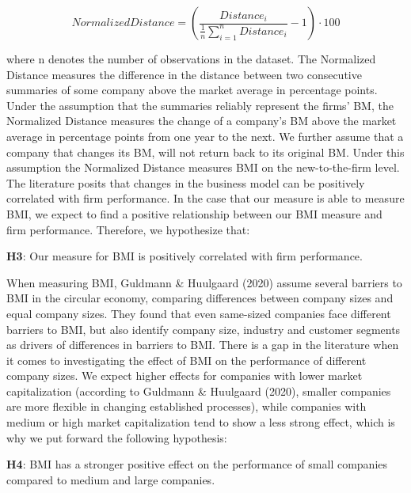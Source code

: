 \documentclass[
]{article}
\begin{document}
\[
{NormalizedDistance} = \left( \frac{{Distance}_i}{\frac{1}{n} \sum_{i=1}^{n} {Distance}_i} - 1 \right) \cdot 100
\]

where n denotes the number of observations in the dataset. The
Normalized Distance measures the difference in the distance between two
consecutive summaries of some company above the market average in
percentage points. Under the assumption that the summaries reliably
represent the firms' BM, the Normalized Distance measures the change of
a company's BM above the market average in percentage points from one
year to the next. We further assume that a company that changes its BM,
will not return back to its original BM. Under this assumption the
Normalized Distance measures BMI on the new-to-the-firm level. The
literature posits that changes in the business model can be positively
correlated with firm performance. In the case that our measure is able
to measure BMI, we expect to find a positive relationship between our
BMI measure and firm performance. Therefore, we hypothesize that:

\textbf{H3}: Our measure for BMI is positively correlated with firm
performance.

When measuring BMI, Guldmann \& Huulgaard (2020) assume several barriers
to BMI in the circular economy, comparing differences between company
sizes and equal company sizes. They found that even same-sized companies
face different barriers to BMI, but also identify company size, industry
and customer segments as drivers of differences in barriers to BMI.
There is a gap in the literature when it comes to investigating the
effect of BMI on the performance of different company sizes. We expect
higher effects for companies with lower market capitalization (according
to Guldmann \& Huulgaard (2020), smaller companies are more flexible in
changing established processes), while companies with medium or high
market capitalization tend to show a less strong effect, which is why we
put forward the following hypothesis:

\textbf{H4}: BMI has a stronger positive effect on the performance of
small companies compared to medium and large companies.
\end{document}
